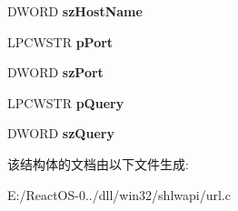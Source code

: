 \begin{DoxyCompactItemize}
D\+W\+O\+RD {\bfseries sz\+Host\+Name}
\item 
\mbox{\label{struct_w_i_n_e___p_a_r_s_e___u_r_l_a71689e74ec2b4c058a9df247362d7640}} 
L\+P\+C\+W\+S\+TR {\bfseries p\+Port}
\item 
\mbox{\label{struct_w_i_n_e___p_a_r_s_e___u_r_l_a10b34f3aa67e9cf3328b5aad75d608b0}} 
D\+W\+O\+RD {\bfseries sz\+Port}
\item 
\mbox{\label{struct_w_i_n_e___p_a_r_s_e___u_r_l_a05d1fdb65c461075884b0a178dd0e08b}} 
L\+P\+C\+W\+S\+TR {\bfseries p\+Query}
\item 
\mbox{\label{struct_w_i_n_e___p_a_r_s_e___u_r_l_a09c37cc4c4108b64e80d5ec362886157}} 
D\+W\+O\+RD {\bfseries sz\+Query}
\end{DoxyCompactItemize}


该结构体的文档由以下文件生成\+:\begin{DoxyCompactItemize}
\item 
E\+:/\+React\+O\+S-\/0../dll/win32/shlwapi/url.\+c\end{DoxyCompactItemize}
